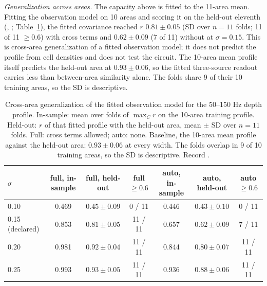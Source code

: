 \textit{Generalization across areas.} The capacity above is fitted to the 11-area mean. Fitting the observation
model on 10 areas and scoring it on the held-out eleventh (, ; Table~\ref{tab:loao}), the fitted
covariance reached $r$ $0.81 \pm 0.05$ (SD over $n = 11$ folds; 11 of 11 $\geq 0.6$) with cross terms and
$0.62 \pm 0.09$ (7 of 11) without at $\sigma = 0.15$. This is cross-area generalization of a fitted observation
model; it does not predict the profile from cell densities and does not test the circuit. The 10-area mean profile
itself predicts the held-out area at $0.93 \pm 0.06$, so the fitted three-source readout carries less than
between-area similarity alone. The folds share 9 of their 10 training areas, so the SD is descriptive.

\begin{table}[tbp]
\centering
\small
\begin{tabular}{lcccccc}
\toprule
$\sigma$ & full, in-sample & full, held-out & full $\geq0.6$ & auto, in-sample & auto, held-out & auto $\geq0.6$ \\
\midrule
0.10 & 0.469 & $0.45 \pm 0.09$ & 0 / 11 & 0.446 & $0.43 \pm 0.10$ & 0 / 11 \\
0.15 (declared) & 0.853 & $0.81 \pm 0.05$ & 11 / 11 & 0.657 & $0.62 \pm 0.09$ & 7 / 11 \\
0.20 & 0.981 & $0.92 \pm 0.04$ & 11 / 11 & 0.844 & $0.80 \pm 0.07$ & 11 / 11 \\
0.25 & 0.993 & $0.93 \pm 0.05$ & 11 / 11 & 0.936 & $0.88 \pm 0.06$ & 11 / 11 \\
\bottomrule
\end{tabular}
\caption{Cross-area generalization of the fitted observation model for the 50--150 Hz depth profile. In-sample:
mean over folds of $\max_C r$ on the 10-area training profile. Held-out: $r$ of that fitted profile with the
held-out area, mean $\pm$ SD over $n = 11$ folds. Full: cross terms allowed; auto: none. Baseline, the 10-area mean
profile against the held-out area: $0.93 \pm 0.06$ at every width. The folds overlap in 9 of 10 training areas, so
the SD is descriptive. Record .}
\label{tab:loao}
\end{table}

